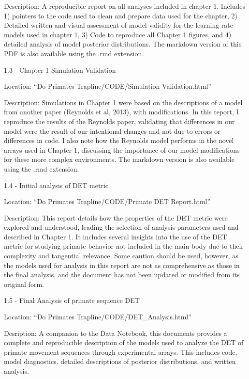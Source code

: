 \documentclass[twoside,12pt,final]{ucthesis-CA2012}
\begin{document}
\begin{ucmainmatter}
Description: A reproducible report on all analyses included in chapter 1. Includes 1) pointers to the code used to clean and prepare data used for the chapter, 2) Detailed written and visual assessment of model validity for the learning rate models used in chapter 1, 3) Code to reproduce all Chapter 1 figures, and 4) detailed analysis of model posterior distributions. The markdown version of this PDF is also available using the .rmd extension.

1.3 - Chapter 1 Simulation Validation

Location: ``Do Primates Trapline/CODE/Simulation-Validation.html''

Description: Simulations in Chapter 1 were based on the descriptions of a model from another paper (Reynolds et al, 2013), with modifications. In this report, I reproduce the results of the Reynolds paper, validating that differences in our model were the result of our intentional changes and not due to errors or differences in code. I also note how the Reynolds model performs in the novel arrays used in Chapter 1, discussing the importance of our model modifications for these more complex environments. The markdown version is also available using the .rmd extension.

1.4 - Initial analysis of DET metric

Location: ``Do Primates Trapline/CODE/Primate DET Report.html''

Description: This report details how the properties of the DET metric were explored and understood, leading the selection of analysis parameters used and described in Chapter 1. It includes several insights into the use of the DET metric for studying primate behavior not included in the main body due to their complexity and tangential relevance. Some caution should be used, however, as the models used for analysis in this report are not as comprehensive as those in the final analysis, and the document has not been updated or modified from its original form.

1.5 - Final Analysis of primate sequence DET

Location: ``Do Primates Trapline/CODE/DET\_Analysis.html''

Desription: A companion to the Data Notebook, this documents provides a complete and reproducible description of the models used to analyze the DET of primate movement sequences through experimental arrays. This includes code, model diagnostics, detailed descriptions of posterior distributions, and written analysis.


\end{ucmainmatter}
\end{document}
